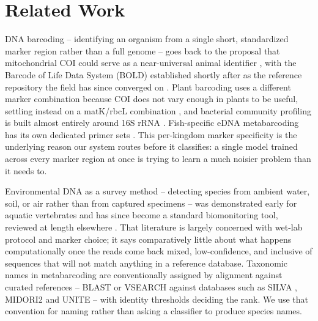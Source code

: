 \documentclass[conference]{IEEEtran}
\begin{document}
\section{Related Work}

DNA barcoding -- identifying an organism from a single short, standardized marker region rather than a full genome -- goes back to the proposal that mitochondrial COI could serve as a near-universal animal identifier \cite{hebert2003biological}, with the Barcode of Life Data System (BOLD) established shortly after as the reference repository the field has since converged on \cite{ratnasingham2007bold}. Plant barcoding uses a different marker combination because COI does not vary enough in plants to be useful, settling instead on a matK/rbcL combination \cite{cbol2009plant}, and bacterial community profiling is built almost entirely around 16S rRNA \cite{klindworth201316s}. Fish-specific eDNA metabarcoding has its own dedicated primer sets \cite{miya2015mifish}. This per-kingdom marker specificity is the underlying reason our system routes before it classifies: a single model trained across every marker region at once is trying to learn a much noisier problem than it needs to.

Environmental DNA as a survey method -- detecting species from ambient water, soil, or air rather than from captured specimens -- was demonstrated early for aquatic vertebrates \cite{ficetola2008edna} and has since become a standard biomonitoring tool, reviewed at length elsewhere \cite{deiner2017edna,taberlet2012edna}. That literature is largely concerned with wet-lab protocol and marker choice; it says comparatively little about what happens computationally once the reads come back mixed, low-confidence, and inclusive of sequences that will not match anything in a reference database. Taxonomic names in metabarcoding are conventionally assigned by alignment against curated references -- BLAST \cite{altschul1990blast,camacho2009blastplus} or VSEARCH \cite{rognes2016vsearch} against databases such as SILVA \cite{quast2013silva}, MIDORI2 \cite{leray2022midori2} and UNITE \cite{nilsson2019unite} -- with identity thresholds deciding the rank. We use that convention for naming rather than asking a classifier to produce species names.
\end{document}
